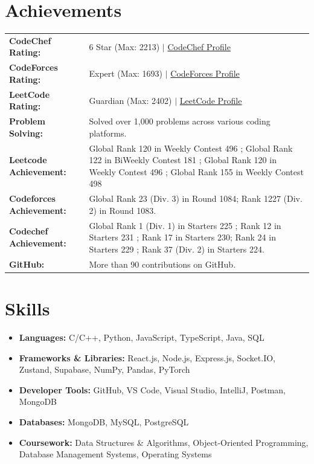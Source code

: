 \documentclass[a4paper,11pt]{article}
\begin{document}
\section{Achievements}
\begin{tabularx}{\linewidth}{@{}l X@{}}
\textbf{CodeChef Rating:} & 6 Star (Max: 2213) $|$ \href{https://www.codechef.com/}{CodeChef Profile} \\[2pt]
\textbf{CodeForces Rating:} & Expert (Max: 1693) $|$ \href{https://codeforces.com/}{CodeForces Profile} \\[2pt]
\textbf{LeetCode Rating:} & Guardian (Max: 2402) $|$ \href{https://leetcode.com/}{LeetCode Profile} \\[2pt]
\textbf{Problem Solving:} & Solved over 1,000 problems across various coding platforms. \\[2pt]
\textbf{Leetcode Achievement:} & Global Rank 120 in Weekly Contest 496 ; Global Rank 122 in BiWeekly Contest 181 ; Global Rank 120 in Weekly Contest 496 ; Global Rank 155 in Weekly Contest 498 \\[2pt]
\textbf{Codeforces Achievement:} & Global Rank 23 (Div. 3) in Round 1084; Rank 1227 (Div. 2) in Round 1083. \\[2pt]
\textbf{Codechef Achievement:} & Global Rank 1 (Div. 1) in Starters 225 ; Rank 12 in Starters 231 ; Rank 17 in Starters 230; Rank 24 in Starters 229 ; Rank 37 (Div. 2) in Starters 224. \\[2pt]
\textbf{GitHub:} & More than 90 contributions on GitHub. \\
\end{tabularx}

\section{Skills}
\begin{itemize}[leftmargin=0pt,label=\textbullet,itemsep=2pt,topsep=2pt,labelsep=8pt]
  \item \textbf{Languages:} C/C++, Python, JavaScript, TypeScript, Java, SQL
  \item \textbf{Frameworks \& Libraries:} React.js, Node.js, Express.js, Socket.IO, Zustand, Supabase, NumPy, Pandas, PyTorch
  \item \textbf{Developer Tools:} GitHub, VS Code, Visual Studio, IntelliJ, Postman, MongoDB
  \item \textbf{Databases:} MongoDB, MySQL, PostgreSQL
  \item \textbf{Coursework:} Data Structures \& Algorithms, Object-Oriented Programming, Database Management Systems, Operating Systems
\end{itemize}
\end{document}
